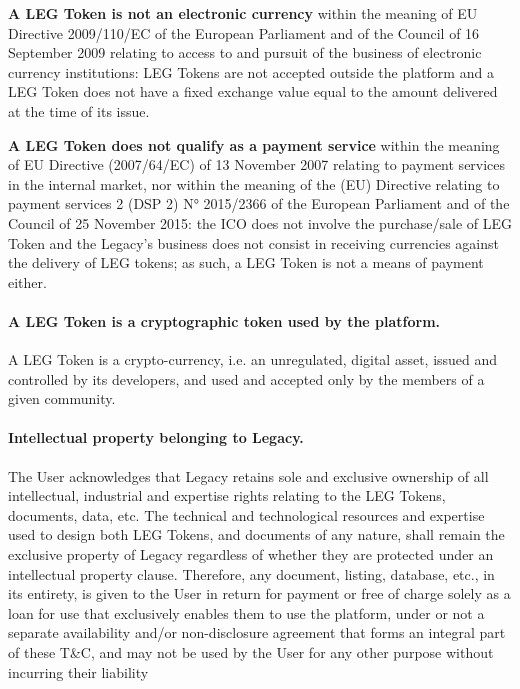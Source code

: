 \vspace{4mm}
\noindent
\textbf{A LEG Token is not an electronic currency} within the meaning of EU Directive 2009/110/EC of the European Parliament and of the Council of 16 September 2009 relating to access to and pursuit of the business of electronic currency institutions: LEG Tokens are not accepted outside the platform and a LEG Token does not have a fixed exchange value equal to the amount delivered at the time of its issue.

\vspace{4mm}
\noindent
\textbf{A LEG Token does not qualify as a payment service} within the meaning of EU Directive (2007/64/EC) of 13 November 2007 relating to payment services in the internal market, nor within the meaning of the (EU) Directive relating to payment services 2 (DSP 2) N° 2015/2366 of the European Parliament and of the Council of 25 November 2015: the ICO does not involve the purchase/sale of LEG Token and the Legacy’s business does not consist in receiving currencies against the delivery of LEG tokens; as such, a LEG Token is not a means of payment either.

\paragraph{A LEG Token is a cryptographic token used by the platform.}
A LEG Token is a crypto-currency, i.e. an unregulated, digital asset, issued and controlled by its developers, and used and accepted only by the members of a given community.

\paragraph{Intellectual property belonging to Legacy.}
The User acknowledges that Legacy retains sole and exclusive ownership of all intellectual, industrial and expertise rights relating to the LEG Tokens, documents, data, etc. The technical and technological resources and expertise used to design both LEG Tokens, and documents of any nature, shall remain the exclusive property of Legacy regardless of whether they are protected under an intellectual property clause. Therefore, any document, listing, database, etc., in its entirety, is given to the User in return for payment or free of charge solely as a loan for use that exclusively enables them to use the platform, under or not a separate availability and/or non-disclosure agreement that forms an integral part of these T\&C, and may not be used by the User for any other purpose without incurring their liability 

